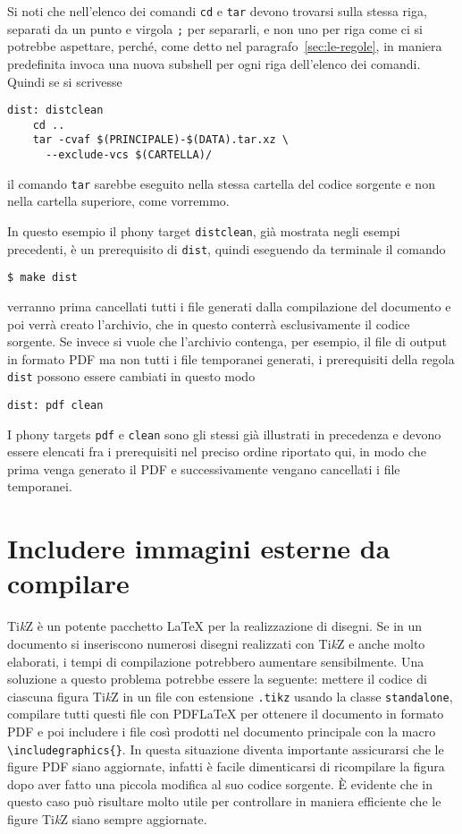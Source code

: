 Si noti che nell'elenco dei comandi \texttt{cd} e \texttt{tar} devono trovarsi
sulla stessa riga, separati da un punto e virgola \texttt{;} per separarli, e
non uno per riga come ci si potrebbe aspettare, perché, come detto nel
paragrafo~\ref{sec:le-regole},  in maniera predefinita invoca
una nuova subshell per ogni riga dell'elenco dei comandi.  Quindi se si
scrivesse
\begin{lstlisting}
dist: distclean
	cd ..
	tar -cvaf $(PRINCIPALE)-$(DATA).tar.xz \
	  --exclude-vcs $(CARTELLA)/
\end{lstlisting}
il comando \texttt{tar} sarebbe eseguito nella stessa cartella del codice
sorgente e non nella cartella superiore, come vorremmo.

In questo esempio il phony target \texttt{distclean}, già mostrata negli esempi
precedenti, è un prerequisito di \texttt{dist}, quindi eseguendo da terminale il
comando
\begin{verbatim}
$ make dist
\end{verbatim}
verranno prima cancellati tutti i file generati dalla compilazione del documento
e poi verrà creato l'archivio, che in questo conterrà esclusivamente il codice
sorgente.  Se invece si vuole che l'archivio contenga, per esempio, il file di
output in formato \textsc{PDF} ma non tutti i file temporanei generati, i
prerequisiti della regola \texttt{dist} possono essere cambiati in questo modo
\begin{lstlisting}
dist: pdf clean
\end{lstlisting}
I phony targets \texttt{pdf} e \texttt{clean} sono gli stessi già illustrati in
precedenza e devono essere elencati fra i prerequisiti nel preciso ordine
riportato qui, in modo che prima venga generato il \textsc{PDF} e
successivamente vengano cancellati i file temporanei.

\section{Includere immagini esterne da compilare}
\label{sec:includere-immagini-esterne}

Ti\emph{k}Z è un potente pacchetto \LaTeX{}
per la realizzazione di disegni.  Se in un documento si inseriscono numerosi
disegni realizzati con Ti\emph{k}Z e anche molto elaborati, i tempi di
compilazione potrebbero aumentare sensibilmente.  Una soluzione a questo
problema potrebbe essere la seguente: mettere il codice di ciascuna figura
Ti\emph{k}Z in un file con estensione \texttt{.tikz} usando la classe
\texttt{standalone}, compilare tutti questi file con \textsc{PDF}\LaTeX{}
per ottenere il documento in formato \textsc{PDF} e poi includere i file così
prodotti nel documento principale con la macro
\texttt{\textbackslash{}includegraphics\{\}}.  In questa situazione diventa
importante assicurarsi che le figure \textsc{PDF} siano aggiornate, infatti è
facile dimenticarsi di ricompilare la figura dopo aver fatto una piccola
modifica al suo codice sorgente.  È evidente che in questo caso 
può risultare molto utile per controllare in maniera efficiente che le figure
Ti\emph{k}Z siano sempre aggiornate.

